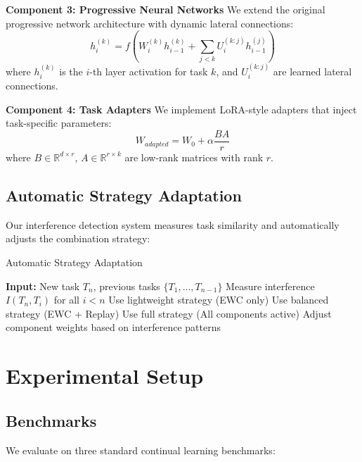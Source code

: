 \documentclass{article}
\begin{document}
\textbf{Component 3: Progressive Neural Networks}
We extend the original progressive network architecture with dynamic lateral connections:
\begin{equation}
    h_i^{(k)} = f(W_i^{(k)} h_{i-1}^{(k)} + \sum_{j<k} U_i^{(k:j)} h_{i-1}^{(j)})
\end{equation}
where $h_i^{(k)}$ is the $i$-th layer activation for task $k$, and $U_i^{(k:j)}$ are learned lateral connections.

\textbf{Component 4: Task Adapters}
We implement LoRA-style adapters that inject task-specific parameters:
\begin{equation}
    W_{adapted} = W_0 + \alpha \frac{BA}{r}
\end{equation}
where $B \in \mathbb{R}^{d \times r}$, $A \in \mathbb{R}^{r \times k}$ are low-rank matrices with rank $r$.

\subsection{Automatic Strategy Adaptation}

Our interference detection system measures task similarity and automatically adjusts the combination strategy:

\begin{algorithm}[ht]
\caption{Automatic Strategy Adaptation}
\begin{algorithmic}[1]
\STATE \textbf{Input:} New task $T_n$, previous tasks $\{T_1, ..., T_{n-1}\}$
\STATE Measure interference $I(T_n, T_i)$ for all $i < n$
    \STATE Use lightweight strategy (EWC only)
    \STATE Use balanced strategy (EWC + Replay)
\ELSE
    \STATE Use full strategy (All components active)
\ENDIF
\STATE Adjust component weights based on interference patterns
\end{algorithmic}
\end{algorithm}

\section{Experimental Setup}

\subsection{Benchmarks}

We evaluate on three standard continual learning benchmarks:
\end{document}
